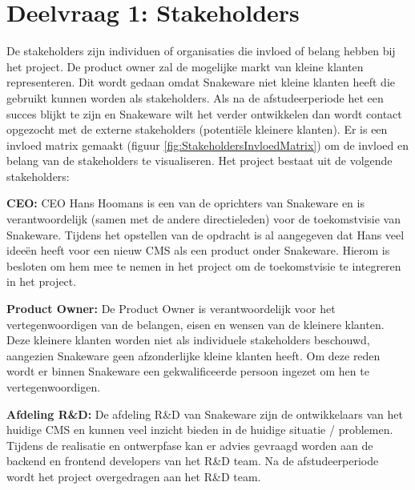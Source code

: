 \section{Deelvraag 1: Stakeholders}
De stakeholders zijn individuen of organisaties die invloed of belang hebben bij het project.
De product owner zal de mogelijke markt van kleine klanten representeren.
Dit wordt gedaan omdat Snakeware niet kleine klanten heeft die gebruikt kunnen worden als stakeholders.
Als na de afstudeerperiode het een succes blijkt te zijn en Snakeware wilt het verder ontwikkelen dan wordt contact opgezocht met de externe stakeholders (potentiële kleinere klanten). 
Er is een invloed matrix gemaakt (figuur \ref{fig:StakeholdersInvloedMatrix}) om de invloed en belang van de stakeholders te visualiseren. 
Het project bestaat uit de volgende stakeholders:

\whitespace
\textbf{CEO:}
CEO Hans Hoomans is een van de oprichters van Snakeware en is verantwoordelijk (samen met de andere directieleden) voor de toekomstvisie van Snakeware.
Tijdens het opstellen van de opdracht is al aangegeven dat Hans veel ideeën heeft voor een nieuw \gls{CMS} als een product onder Snakeware.
Hierom is besloten om hem mee te nemen in het project om de toekomstvisie te integreren in het project.

\whitespace
\textbf{Product Owner:}
De Product Owner is verantwoordelijk voor het vertegenwoordigen van de belangen, eisen en wensen van de kleinere klanten.
Deze kleinere klanten worden niet als individuele stakeholders beschouwd, aangezien Snakeware geen afzonderlijke kleine klanten heeft.
Om deze reden wordt er binnen Snakeware een gekwalificeerde persoon ingezet om hen te vertegenwoordigen.

\whitespace
\textbf{Afdeling R\&D:} De afdeling R\&D van Snakeware zijn de ontwikkelaars van het huidige \gls{CMS} en kunnen veel inzicht bieden in de huidige situatie / problemen.
Tijdens de realisatie en ontwerpfase kan er advies gevraagd worden aan de backend en frontend developers van het R\&D team.
Na de afstudeerperiode wordt het project overgedragen aan het R\&D team.

